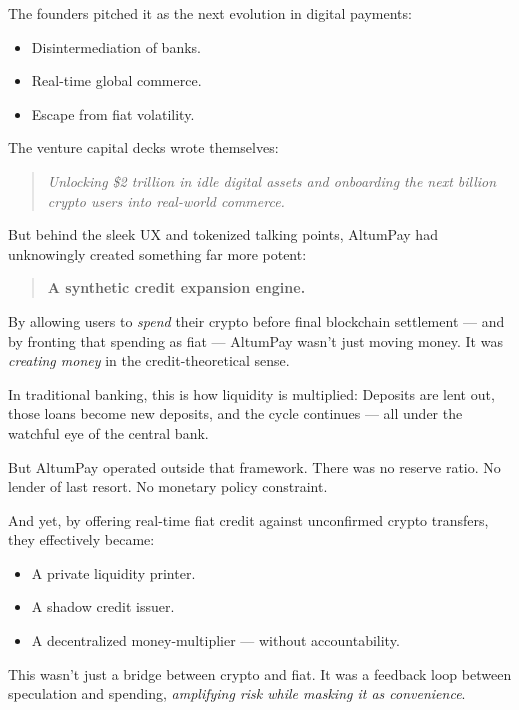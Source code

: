 The founders pitched it as the next evolution in digital payments:

\begin{itemize}
  \item Disintermediation of banks.
  \item Real-time global commerce.
  \item Escape from fiat volatility.
\end{itemize}

The venture capital decks wrote themselves:

\begin{quote}
\textit{Unlocking \$2 trillion in idle digital assets and onboarding the next billion crypto users into real-world commerce.}
\end{quote}

\medskip

But behind the sleek UX and tokenized talking points, AltumPay had unknowingly created something far more potent:

\begin{quote}
\textbf{A synthetic credit expansion engine.}
\end{quote}

By allowing users to \textit{spend} their crypto before final blockchain settlement --- and by fronting that spending as fiat --- AltumPay wasn't just moving money.  
It was \textit{creating money} in the credit-theoretical sense.

\medskip

In traditional banking, this is how liquidity is multiplied:  
Deposits are lent out, those loans become new deposits, and the cycle continues --- all under the watchful eye of the central bank.

But AltumPay operated outside that framework.  
There was no reserve ratio.  
No lender of last resort.  
No monetary policy constraint.

And yet, by offering real-time fiat credit against unconfirmed crypto transfers, they effectively became:

\begin{itemize}
  \item A private liquidity printer.
  \item A shadow credit issuer.
  \item A decentralized money-multiplier --- without accountability.
\end{itemize}

This wasn’t just a bridge between crypto and fiat.  
It was a feedback loop between speculation and spending,  
\textit{amplifying risk while masking it as convenience}.


